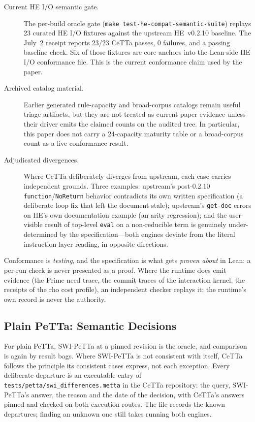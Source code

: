 \documentclass[11pt]{article}
\newcommand{\code}[1]{\texttt{#1}}
\newcommand{\PeTTa}{\textup{PeTTa}}
\newcommand{\HE}{\textup{HE}}
\newcommand{\CeTTa}{\textup{CeTTa}}
\begin{document}
\begin{description}
\item[Current \HE{} I/O semantic gate.] The per-build oracle gate
  (\code{make test-he-compat-semantic-suite}) replays 23 curated
  \HE{} I/O fixtures against the upstream \HE{}~v0.2.10 baseline.  The
  July~2 receipt reports 23/23 \CeTTa{} passes, 0 failures, and a
  passing baseline check.  Six of those fixtures are core anchors into
  the Lean-side HE I/O conformance file.  This is the current
  conformance claim used by the paper.
\item[Archived catalog material.] Earlier generated rule-capacity and
  broad-corpus catalogs remain useful triage artifacts, but they are not
  treated as current paper evidence unless their driver emits the claimed
  counts on the audited tree.  In particular, this paper does not
  carry a 24-capacity maturity table or a broad-corpus count as a live
  conformance result.
\item[Adjudicated divergences.] Where \CeTTa{} deliberately diverges
  from upstream, each case carries independent grounds.  Three
  examples: upstream's post-0.2.10 \code{function}/\code{NoReturn}
  behavior contradicts its own written specification (a deliberate
  loop fix that left the document stale); upstream's \code{get-doc}
  errors on \HE{}'s own documentation example (an arity regression);
  and the user-visible result of top-level \code{eval} on a
  non-reducible term is genuinely under-determined by the
  specification---both engines deviate from the literal
  instruction-layer reading, in opposite directions.
\end{description}

Conformance is \emph{testing}, and the specification is what gets
\emph{proven about} in Lean: a per-run check is never presented as a
proof.  Where the runtime does emit evidence (the Prime need trace, the
commit traces of the interaction kernel, the receipts of the rho cost
profile), an independent checker replays it; the runtime's own record is
never the authority.

\subsection{Plain \PeTTa{}: Semantic Decisions}
\label{sec:petta-decisions}

For plain \PeTTa{}, SWI-\PeTTa{} at a pinned revision is the oracle, and
comparison is again by result bags.  Where SWI-\PeTTa{} is not consistent
with itself, \CeTTa{} follows the principle its consistent cases express,
not each exception.  Every deliberate departure is an executable entry of
\code{tests/petta/swi\_differences.metta} in the \CeTTa{} repository: the
query, SWI-\PeTTa{}'s answer, the reason and the date of the decision, with
\CeTTa{}'s answers pinned and checked on both execution routes.  The file
records the known departures; finding an unknown one still takes running
both engines.
\end{document}
